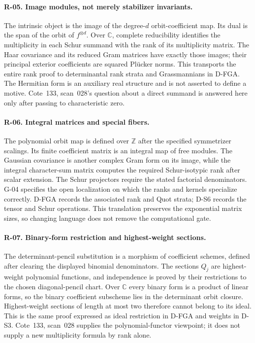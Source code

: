 \documentclass[11pt,a4paper]{article}
\theoremstyle{definition}\newtheorem{definition}{Definition}
\begin{document}
\paragraph{R-05. Image modules, not merely stabilizer invariants.}
The intrinsic object is the image of the degree-$d$ orbit-coefficient map. Its dual is the span of the orbit of $f^{\otimes d}$. Over $\mathbb C$, complete reducibility identifies the multiplicity in each Schur summand with the rank of its multiplicity matrix. The Haar covariance and its reduced Gram matrices have exactly those images; their principal exterior coefficients are squared Pl\"ucker norms. This transports the entire rank proof to determinantal rank strata and Grassmannians in D-FGA. The Hermitian form is an auxiliary real structure and is not asserted to define a motive. Cote~133, scan~028's question about a direct summand is answered here only after passing to characteristic zero.

\paragraph{R-06. Integral matrices and special fibers.}
The polynomial orbit map is defined over $\mathbb Z$ after the specified symmetrizer scalings. Its finite coefficient matrix is an integral map of free modules. The Gaussian covariance is another complex Gram form on its image, while the integral character-sum matrix computes the required Schur-isotypic rank after scalar extension. The Schur projectors require the stated factorial denominators. G-04 specifies the open localization on which the ranks and kernels specialize correctly. D-FGA records the associated rank and Quot strata; D-S6 records the tensor and Schur operations. This translation preserves the exponential matrix sizes, so changing language does not remove the computational gate.

\paragraph{R-07. Binary-form restriction and highest-weight sections.}
The determinant-pencil substitution is a morphism of coefficient schemes, defined after clearing the displayed binomial denominators. The sections $Q_j$ are highest-weight polynomial functions, and independence is proved by their restrictions to the chosen diagonal-pencil chart. Over $\mathbb C$ every binary form is a product of linear forms, so the binary coefficient subscheme lies in the determinant orbit closure. Highest-weight sections of length at most two therefore cannot belong to its ideal. This is the same proof expressed as ideal restriction in D-FGA and weights in D-S3. Cote~133, scan~028 supplies the polynomial-functor viewpoint; it does not supply a new multiplicity formula by rank alone.
\end{document}
